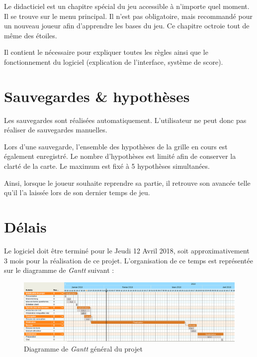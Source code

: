 \documentclass[a4paper, 12pt]{report}
\begin{document}
		Le didacticiel est un chapitre spécial du jeu accessible à n'importe quel moment. Il se trouve sur le menu principal. 
		Il n'est pas obligatoire, mais recommandé pour un nouveau joueur afin d'apprendre les bases du jeu. Ce chapitre octroie tout de même des étoiles.
		
		Il contient le nécessaire pour expliquer toutes les règles ainsi que le fonctionnement du logiciel (explication de l'interface, système de score).


	\section{Sauvegardes \& hypothèses}
	\vspace*{0.2cm}
	
		Les sauvegardes sont réalisées automatiquement. L'utilisateur ne peut donc pas réaliser de sauvegardes manuelles. 
		
		Lors d'une sauvegarde, l'ensemble des hypothèses de la grille en cours est également enregistré. Le nombre d'hypothèses est limité afin de conserver la clarté de la carte. Le maximum est fixé à 5 hypothèses simultanées.
		
		Ainsi, lorsque le joueur souhaite reprendre sa partie, il retrouve son avancée telle qu'il l'a laissée lors de son dernier temps de jeu.
	
	\section{Délais}
	\vspace*{0.2cm}
	
		Le logiciel doit être terminé pour le Jeudi 12 Avril 2018, soit approximativement 3 mois pour la réalisation de ce projet. L'organisation de ce temps est représentée sur le diagramme de \textit{Gantt} suivant :
	\vspace*{0.5cm}

	\begin{figure}[H]
		\centering
		\caption{Diagramme de \textit{Gantt} général du projet}
		\includegraphics[width=17cm]{ganttGeneral.png}
	\end{figure}	     
		
\end{document}
